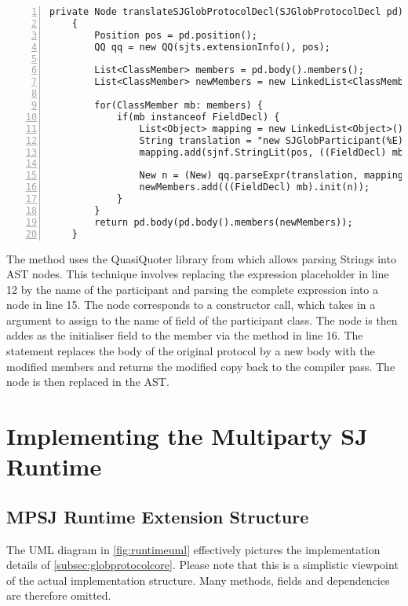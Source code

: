 \begin{lstlisting}[basicstyle=\LISTINGSTYLE, numbers=left]
	private Node translateSJGlobProtocolDecl(SJGlobProtocolDecl pd) throws SemanticException
	{		
		Position pos = pd.position();
		QQ qq = new QQ(sjts.extensionInfo(), pos);
		
		List<ClassMember> members = pd.body().members();
		List<ClassMember> newMembers = new LinkedList<ClassMember>();	
		
		for(ClassMember mb: members) {
			if(mb instanceof FieldDecl) {
				List<Object> mapping = new LinkedList<Object>();
				String translation = "new SJGlobParticipant(%E)";
				mapping.add(sjnf.StringLit(pos, ((FieldDecl) mb).name()));
			
				New n = (New) qq.parseExpr(translation, mapping);
				newMembers.add(((FieldDecl) mb).init(n));
			}
		}
		return pd.body(pd.body().members(newMembers));
	}
\end{lstlisting}

The method uses the QuasiQuoter library from  which allows parsing Strings into AST nodes. This technique involves replacing the expression placeholder  in line 12 by the name of the participant and parsing the complete expression into a  node in line 15. The  node corresponds to a  constructor call, which takes in a  argument to assign to the name of field of the participant class. The node is then addes as the initialiser field to the member via the method  in line 16. The  statement replaces the body of the original protocol by a new body with the modified members and returns the modified copy back to the compiler pass. The node is then replaced in the AST. 

\section{Implementing the Multiparty SJ Runtime}

\subsection{MPSJ Runtime Extension Structure}

The UML diagram in \autoref{fig:runtimeuml} effectively pictures the implementation details of \autoref{subsec:globprotocolcore}. Please note that this is a simplistic viewpoint of the actual implementation structure. Many methods, fields and dependencies are therefore omitted.


